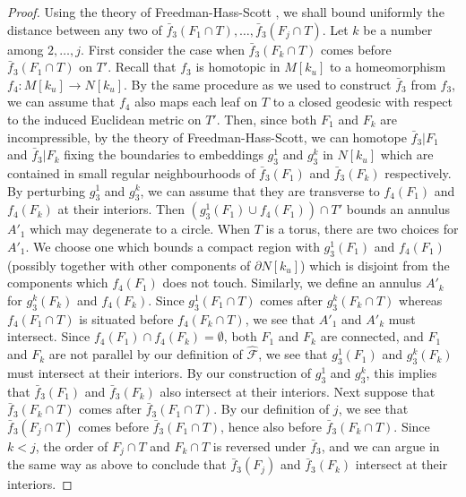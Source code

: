 \documentclass{amsart}
\theoremstyle{definition}
\numberwithin{figure}{section}
\numberwithin{equation}{section}
\begin{document}
\begin{proof}
Using the theory of Freedman-Hass-Scott \cite{fhs}, we shall bound uniformly the distance between any two of $\bar f_3(F_{1} \cap T), \dots , \bar f_3(F_j \cap T)$.
Let $k$ be a number among $2, \dots , j$.
First consider the case when $\bar f_3(F_k\cap T)$ comes before $\bar f_3(F_1 \cap T)$ on $T'$. 
Recall that $f_3$ is homotopic in $M[k_u]$ to a homeomorphism $f_4: M[k_u] \rightarrow N[k_u]$.
By the same procedure as we used to construct $\bar f_3$ from $f_3$, we can assume that $f_4$ also maps each leaf on $T$ to a closed geodesic with respect to the induced Euclidean metric on $T'$.
Then, since both $F_1$ and $F_k$ are incompressible, by the theory of  Freedman-Hass-Scott, we can homotope $\bar f_3|F_1$ and $\bar f_3| F_k$ fixing the boundaries to embeddings $g_3^1$ and $g_3^k$ in $N[k_u]$ which are contained in  small regular neighbourhoods of $\bar f_3(F_1)$ and $\bar f_3(F_k)$ respectively.
By perturbing $g_3^1$ and $g_3^k$, we can assume that they are transverse to $f_4( F_1)$ and $f_4(F_k)$ at their interiors.
Then $(g_3^1(F_1) \cup f_4( F_1)) \cap T'$ bounds an annulus $A'_1$ which may degenerate to a circle.
When $T$ is a torus, there are two choices for $A'_1$.
We choose one which bounds a compact region with $g_3^1(F_1)$ and $f_4(F_1)$ (possibly together with other components of $\partial N[k_u]$) which is disjoint from the components which $f_4(F_1)$ does not touch.
Similarly, we define an annulus $A'_k$ for $g_3^k(F_k)$ and $f_4( F_k)$.
Since  $g_3^1(F_1 \cap T)$ comes after $g_3^k(F_k \cap T)$ whereas $f_4(F_1\cap T)$ is situated before $f_4(F_k \cap T)$, we see that $A'_1$ and $A'_k$ must intersect.
Since  $f_4(F_1)\cap f_4( F_k)=\emptyset$, both $F_1$ and $F_k$  are connected, and $F_1$ and $F_k$ are not parallel by our definition of $\hat{\mathcal F}$, we see that $g_3^1(F_1)$ and $g_3^k(F_k)$ must intersect at their interiors.
By our construction of $g_3^1$ and $g_3^k$, this implies that $\bar f_3( F_1)$ and $\bar f_3( F_k)$ also intersect at their interiors.
Next suppose that $\bar f_3(F_k\cap T)$ comes after $\bar f_3(F_1\cap T)$.
By our definition of $j$, we see that $\bar f_3(F_j\cap T)$ comes before $\bar f_3(F_1\cap T)$, hence also before $\bar f_3(F_k\cap T)$.
Since $k < j$,  the order of $F_j \cap T$ and $F_k \cap T$ is reversed under $\bar f_3$, and we can argue in the same way as above to conclude that $\bar f_3( F_j)$ and $\bar f_3( F_k)$ intersect at their interiors.


\end{proof}
\end{document}
